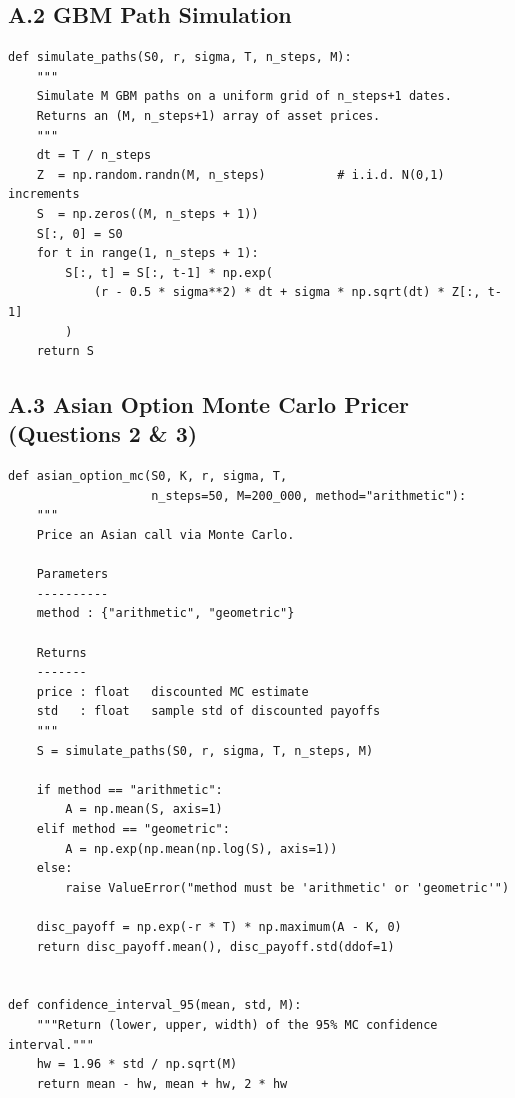 \documentclass[11pt,a4paper]{article}
\theoremstyle{plain}
\theoremstyle{definition}
\begin{document}
\subsection*{A.2 \quad GBM Path Simulation}

\begin{lstlisting}[style=pythonstyle,
  caption={Exact log-normal GBM path simulation under the risk-neutral measure.}]
def simulate_paths(S0, r, sigma, T, n_steps, M):
    """
    Simulate M GBM paths on a uniform grid of n_steps+1 dates.
    Returns an (M, n_steps+1) array of asset prices.
    """
    dt = T / n_steps
    Z  = np.random.randn(M, n_steps)          # i.i.d. N(0,1) increments
    S  = np.zeros((M, n_steps + 1))
    S[:, 0] = S0
    for t in range(1, n_steps + 1):
        S[:, t] = S[:, t-1] * np.exp(
            (r - 0.5 * sigma**2) * dt + sigma * np.sqrt(dt) * Z[:, t-1]
        )
    return S
\end{lstlisting}

\subsection*{A.3 \quad Asian Option Monte Carlo Pricer (Questions 2 \& 3)}

\begin{lstlisting}[style=pythonstyle,
  caption={Monte Carlo Asian call pricer with 95\% confidence interval.}]
def asian_option_mc(S0, K, r, sigma, T,
                    n_steps=50, M=200_000, method="arithmetic"):
    """
    Price an Asian call via Monte Carlo.

    Parameters
    ----------
    method : {"arithmetic", "geometric"}

    Returns
    -------
    price : float   discounted MC estimate
    std   : float   sample std of discounted payoffs
    """
    S = simulate_paths(S0, r, sigma, T, n_steps, M)

    if method == "arithmetic":
        A = np.mean(S, axis=1)
    elif method == "geometric":
        A = np.exp(np.mean(np.log(S), axis=1))
    else:
        raise ValueError("method must be 'arithmetic' or 'geometric'")

    disc_payoff = np.exp(-r * T) * np.maximum(A - K, 0)
    return disc_payoff.mean(), disc_payoff.std(ddof=1)


def confidence_interval_95(mean, std, M):
    """Return (lower, upper, width) of the 95% MC confidence interval."""
    hw = 1.96 * std / np.sqrt(M)
    return mean - hw, mean + hw, 2 * hw
\end{lstlisting}
\end{document}
